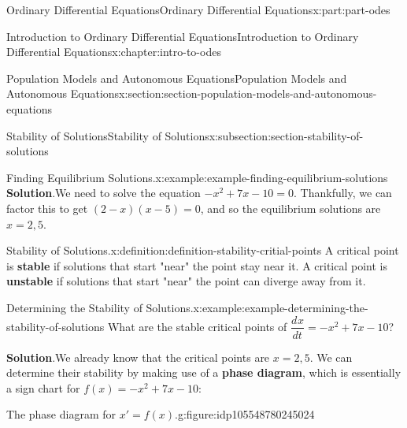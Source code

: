 \documentclass[oneside,10pt,]{book}
\newcommand{\blocktitlefont}{\relax}
\newcommand{\terminology}[1]{\textbf{#1}}
\numberwithin{equation}{part}
\newcommand{\dv}[3][]{\dfrac{d^{#1} #2}{d #3^{#1}}}
\begin{document}
\begin{partptx}{Ordinary Differential Equations}{}{Ordinary Differential Equations}{}{}{x:part:part-odes}
\begin{chapterptx}{Introduction to Ordinary Differential Equations}{}{Introduction to Ordinary Differential Equations}{}{}{x:chapter:intro-to-odes}
\begin{sectionptx}{Population Models and Autonomous Equations}{}{Population Models and Autonomous Equations}{}{}{x:section:section-population-models-and-autonomous-equations}
\begin{subsectionptx}{Stability of Solutions}{}{Stability of Solutions}{}{}{x:subsection:section-stability-of-solutions}
\begin{example}{Finding Equilibrium Solutions.}{x:example:example-finding-equilibrium-solutions}
\noindent\textbf{\blocktitlefont Solution}.\hypertarget{g:solution:idp105548780239008}{}\quad{}We need to solve the equation \(-x^{2} + 7x - 10 = 0\). Thankfully, we can factor this to get \((2-x)(x-5) = 0\), and so the equilibrium solutions are \(x = 2,5\).%
\end{example}
\begin{definition}{Stability of Solutions.}{x:definition:definition-stability-critial-points}%
A critical point is \terminology{stable} if solutions that start "near" the point stay near it. A critical point is \terminology{unstable} if solutions that start "near" the point can diverge away from it.%
\end{definition}
\begin{example}{Determining the Stability of Solutions.}{x:example:example-determining-the-stability-of-solutions}%
What are the stable critical points of \(\dv{x}{t} = -x^{2} + 7x - 10\)?%
\par\smallskip%
\noindent\textbf{\blocktitlefont Solution}.\hypertarget{g:solution:idp105548780243488}{}\quad{}We already know that the critical points are \(x = 2, 5\). We can determine their stability by making use of a \terminology{phase diagram}, which is essentially a sign chart for \(f(x) = -x^{2} + 7x - 10\):%
\begin{figureptx}{The phase diagram for \(x' = f(x).\)}{g:figure:idp105548780245024}{}%
\begin{image}{0.25}{0.5}{0.25}%
\end{image}
\end{figureptx}
\end{example}
\end{subsectionptx}
\end{sectionptx}
\end{chapterptx}
\end{partptx}
\end{document}
